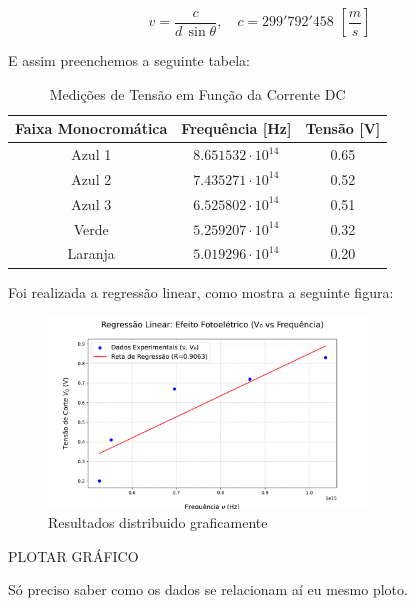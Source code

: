 \documentclass[10pt,twocolumn,letterpaper]{article}
\begin{document}
\vspace{-.25cm}

\begin{equation*}
    v = \frac{c}{d\,\sin{\theta}}, \quad c = 299'792'458 \,\, \left[\frac{m}{s}\right]
\end{equation*}

\noindent E assim preenchemos a seguinte tabela:

\begin{table}[htbp]
    \centering
    \caption{Medições de Tensão em Função da Corrente DC}
    \label{tab:medicoes_tensao}
    \vspace{0.25cm}
    \begin{tabular}{ccc}
        \hline
        \rule{0pt}{3ex}\textbf{Faixa Monocromática} & \textbf{Frequência} [Hz] & \textbf{Tensão} [V]\\[5pt]
        \hline
        \rule{0pt}{3ex}Azul 1 & $8.651532\cdot 10^{14}$ & 0.65 \\
        Azul 2 & $7.435271\cdot 10^{14}$ & 0.52 \\
        Azul 3 & $6.525802\cdot 10^{14}$ & 0.51 \\
        Verde & $5.259207\cdot 10^{14}$ & 0.32 \\
        Laranja & $5.019296\cdot 10^{14}$ & 0.20 \\[5pt]
        \hline
    \end{tabular}
\end{table}

\hspace{1cm}  Foi realizada a regressão linear, como mostra a seguinte figura:

\begin{figure}[h]
    \centering
    \includegraphics[width=8.5cm]{efeito_fotoeletrico_regressao.pdf}
    \caption{Resultados distribuido graficamente}
    \label{fig:label}
\end{figure}

{\Huge \color{red} PLOTAR GRÁFICO}

{\color{red} Só preciso saber como os dados se relacionam aí eu mesmo ploto.}
\end{document}
